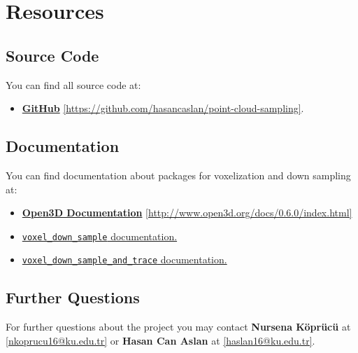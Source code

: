 \documentclass[a4paper]{article}
\makeatletter
\newcommand{\contactName}{Nursena Köprücü}
\newcommand{\contactMail}{nkoprucu16@ku.edu.tr}
\newcommand{\contactNameII}{Hasan Can Aslan}
\newcommand{\contactMailII}{haslan16@ku.edu.tr}
\makeatother
\begin{document}
\section{Resources}
\subsection{Source Code}
You can find all source code at:
\begin{itemize}
\item
\textbf{\href{https://github.com/hasancaslan/point-cloud-sampling}{GitHub}} \href{https://github.com/hasancaslan/point-cloud-sampling}{[https://github.com/hasancaslan/point-cloud-sampling]}.
\end{itemize}

\subsection{Documentation}
You can find documentation about packages for voxelization and down sampling at:
\begin{itemize}
\item
\textbf{\href{http://www.open3d.org/docs/0.6.0/index.html}{Open3D Documentation}}
\href{http://www.open3d.org/docs/0.6.0/index.html}{[http://www.open3d.org/docs/0.6.0/index.html]}
\item
\href{http://www.open3d.org/docs/0.6.0/python_api/open3d.geometry.voxel_down_sample.html?highlight=voxel_down_sample}{\texttt{voxel\_down\_sample} documentation.}
\item
\href{http://www.open3d.org/docs/0.6.0/python_api/open3d.geometry.voxel_down_sample_and_trace.html}{\texttt{voxel\_down\_sample\_and\_trace} documentation.}
\end{itemize}

\subsection{Further Questions}
For further questions about the project you may contact \textbf{\contactName} at \href{mailto:\contactMail}{\mbox{[\contactMail]}} or \textbf{\contactNameII} at \href{mailto:\contactMailII}{\mbox{[\contactMailII]}}.
\end{document}
